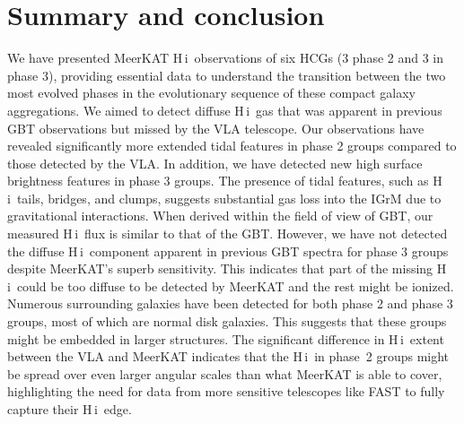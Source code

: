 \documentclass{aa}
\newcommand{\HI}{H\,{\sc i}}
\begin{document}

\section{Summary and conclusion}\label{summary}
We have presented MeerKAT \HI\ observations of six HCGs (3 phase 2 and 3 in phase 3), providing essential data to understand the 
transition between the two most evolved phases in the evolutionary sequence of these compact galaxy aggregations. 
We aimed to detect diffuse \HI\ gas that was apparent in previous 
GBT observations but missed by the VLA telescope. Our observations have revealed significantly more extended 
tidal features in phase 2 groups compared to those detected by the VLA. In addition, we have detected new high 
surface brightness features in phase 3 groups. The presence of tidal features, such as \HI\ tails, bridges, 
and clumps, suggests substantial gas loss into the IGrM due to gravitational interactions. When derived within the field of view of GBT, our measured \HI\ 
flux is similar to that of the GBT. However, we have not detected the diffuse \HI\ component apparent in previous GBT spectra for phase 3 groups despite MeerKAT's 
superb sensitivity. This indicates that part of the missing \HI\ could be too diffuse to be detected by MeerKAT and the rest might be ionized.  
Numerous surrounding galaxies have been detected for both phase 2 and phase 3 groups, most of which are normal disk galaxies. 
This suggests that these groups might be embedded in larger structures. The significant difference in \HI\ extent between 
the VLA and MeerKAT indicates that the \HI\ in phase~2 groups might be spread over even larger angular scales than what 
MeerKAT is able to cover, highlighting the need for data from more sensitive telescopes like FAST to fully capture their \HI\ edge. 
\end{document}
